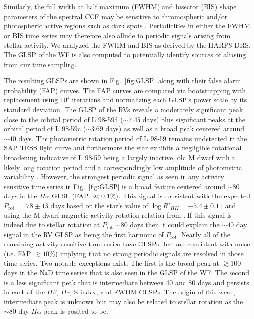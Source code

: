 \documentclass[longauth]{aa}
\newcommand{\prot}{$P_{\text{rot}}$}
\begin{document}
Similarly, the full width at half maximum (FWHM) and bisector (BIS) shape parameters of the spectral CCF may be
sensitive to chromospheric and/or photospheric active regions such as dark spots \citep{queloz01,desort07}.
Periodicities in either the FWHM or BIS time series may therefore also allude to periodic signals arising from
stellar activity. We analyzed the FWHM and BIS as derived by the HARPS DRS. The GLSP of the WF is also computed
to potentially identify sources of aliasing from our time sampling.

The resulting GLSPs are shown in Fig.~\ref{fig:GLSP} along with their false alarm probability (FAP) curves. The FAP curves are computed via bootstrapping with replacement using $10^4$ iterations and normalizing each GLSP's power scale by its standard deviation. The GLSP of the RVs reveals a moderately significant peak close to the orbital period of L 98-59d ($\sim 7.45$ days) plus significant peaks at the orbital period of L 98-59c ($\sim 3.69$ days) as well as a broad peak centered around $\sim 40$ days. The photometric rotation period of L 98-59 remains undetected in the SAP TESS light curve and furthermore the star exhibits a negligible rotational broadening  indicative of L 98-59 being a largely inactive, old M dwarf with a likely long rotation period and a correspondingly low amplitude of photometric variability \citep{newton16a}. However, the strongest periodic signal as seen in any activity sensitive time series in Fig.~\ref{fig:GLSP} is a broad feature centered around $\sim 80$ days in the $H\alpha$ GLSP (FAP $\ll 0.1$\%). This signal is consistent with the expected \prot{} $=78\pm 13$ days based on the star's value of $\log{R'_{HK}}=-5.4\pm 0.11$ and using the M dwarf magnetic activity-rotation relation from \cite{astudillodefru17b}.
If this signal is indeed due to stellar rotation at \prot{} $\sim 80$ days then it could explain the $\sim 40$ day signal in the RV GLSP as being the first harmonic of \prot{.} Nearly all of the remaining activity sensitive time series have GLSPs that are consistent with noise (i.e. FAP $\gtrsim 10$\%) implying that no strong periodic signals are resolved in those time series. Two notable exceptions exist. The first is the broad peak at $\gtrsim 100$ days in the NaD time series that is also seen in the GLSP of the WF. The second is a less significant peak that is intermediate between 40 and 80 days and persists in each of the $H\beta$, $H\gamma$, S-index, and FWHM GLSPs. The origin of this weak, intermediate peak is unknown but may also be related to stellar rotation as the $\sim 80$ day $H\alpha$ peak is posited to be.
\end{document}
